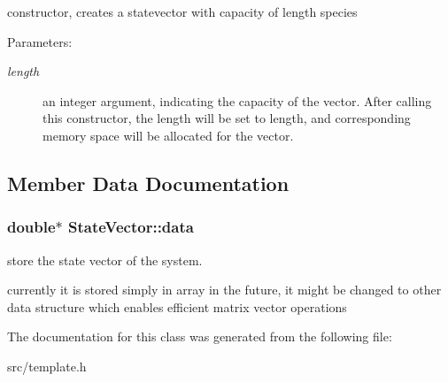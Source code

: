 constructor, creates a statevector with capacity of length species 

\begin{Desc}
\item[Parameters:]
\begin{description}
\item[{\em length}]an integer argument, indicating the capacity of the vector. After calling this constructor, the length will be set to length, and corresponding memory space will be allocated for the vector. \end{description}
\end{Desc}


\subsection{Member Data Documentation}
\hypertarget{class_state_vector_1bbbbb188a0b7cdb6c4c19591d771855}{
\subsubsection{\setlength{\rightskip}{0pt plus 5cm}double$\ast$ {\bf StateVector::data}}}
\label{class_state_vector_1bbbbb188a0b7cdb6c4c19591d771855}


store the state vector of the system. 

currently it is stored simply in array in the future, it might be changed to other data structure which enables efficient matrix vector operations 

The documentation for this class was generated from the following file:\begin{CompactItemize}
\item 
src/template.h\end{CompactItemize}
